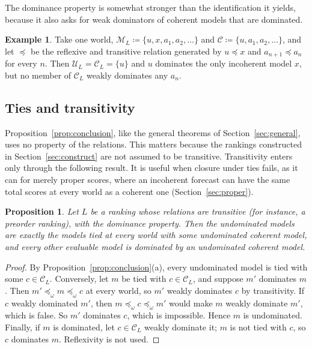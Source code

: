 \documentclass[11pt]{article}
\newtheorem{proposition}[theorem]{Proposition}
\theoremstyle{definition}
\newtheorem{example}[theorem]{Example}
\theoremstyle{remark}
\newcommand{\M}{\mathcal M}
\newcommand{\C}{\mathcal C}
\newcommand{\U}{\mathcal U}
\begin{document}
The dominance property is somewhat stronger than the identification it yields, because it also asks for weak dominators of coherent models that are dominated.
\begin{example}\label{ex:conclusion-stronger}
Take one world, $\M_L\coloneqq\{u,x,a_1,a_2,\dots\}$ and $\C\coloneqq\{u,a_1,a_2,\dots\}$, and let $\preceq$ be the reflexive and transitive relation generated by $u\preceq x$ and $a_{n+1}\preceq a_n$ for every $n$. Then $\U_L=\C_L=\{u\}$ and $u$ dominates the only incoherent model $x$, but no member of $\C_L$ weakly dominates any $a_n$.
\end{example}

\subsection{Ties and transitivity}
Proposition~\ref{prop:conclusion}, like the general theorems of Section~\ref{sec:general}, uses no property of the relations. This matters because the rankings constructed in Section~\ref{sec:construct} are not assumed to be transitive. Transitivity enters only through the following result. It is useful when closure under ties fails, as it can for merely proper scores, where an incoherent forecast can have the same total scores at every world as a coherent one (Section~\ref{sec:proper}).

\begin{proposition}\label{prop:profiles}
Let $L$ be a ranking whose relations are transitive (for instance, a preorder ranking), with the dominance property. Then the undominated models are exactly the models tied at every world with some undominated coherent model, and every other evaluable model is dominated by an undominated coherent model.
\end{proposition}
\begin{proof}
By Proposition~\ref{prop:conclusion}(a), every undominated model is tied with some $c\in\C_L$. Conversely, let $m$ be tied with $c\in\C_L$, and suppose $m'$ dominates $m$. Then $m'\preceq_\omega m\preceq_\omega c$ at every world, so $m'$ weakly dominates $c$ by transitivity. If $c$ weakly dominated $m'$, then $m\preceq_\omega c\preceq_\omega m'$ would make $m$ weakly dominate $m'$, which is false. So $m'$ dominates $c$, which is impossible. Hence $m$ is undominated. Finally, if $m$ is dominated, let $c\in\C_L$ weakly dominate it; $m$ is not tied with $c$, so $c$ dominates $m$. Reflexivity is not used.
\end{proof}
\end{document}
